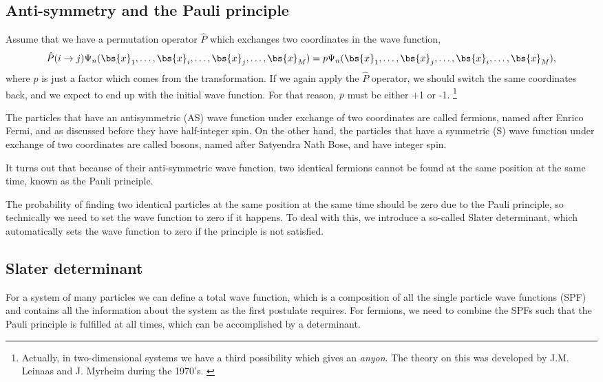 \subsection{Anti-symmetry and the Pauli principle} \label{subsubsec:symmetry}
Assume that we have a permutation operator $\hat{P}$ which exchanges two coordinates in the wave function,
\begin{equation}
\hat{P}(i\rightarrow j)\Psi_n(\bs{x}_1,\hdots,\bs{x}_i,\hdots,\bs{x}_j,\hdots,\bs{x}_M)=p\Psi_n(\bs{x}_1,\hdots,\bs{x}_j,\hdots,\bs{x}_i,\hdots,\bs{x}_M),
\end{equation}
where $p$ is just a factor which comes from the transformation. If we again apply the $\hat{P}$ operator, we should switch the same coordinates back, and we expect to end up with the initial wave function. For that reason, $p$ must be either +1 or -1. \footnote{Actually, in two-dimensional systems we have a third possibility which gives an \textit{anyon}. The theory on this was developed by J.M. Leinaas and J. Myrheim during the 1970's. \cite{leinaas_one_1977}}

The particles that have an antisymmetric (AS) wave function under exchange of two coordinates are called fermions, named after Enrico Fermi, and as discussed before they have half-integer spin. On the other hand, the particles that have a symmetric (S) wave function under exchange of two coordinates are called bosons, named after Satyendra Nath Bose, and have integer spin. 

It turns out that because of their anti-symmetric wave function, two identical fermions cannot be found at the same position at the same time, known as the Pauli principle. 

The probability of finding two identical particles at the same position at the same time should be zero due to the Pauli principle, so technically we need to set the wave function to zero if it happens. To deal with this, we introduce a so-called Slater determinant, which automatically sets the wave function to zero if the principle is not satisfied.

\subsection{Slater determinant} \label{subsec:slater}
For a system of many particles we can define a total wave function, which is a composition of all the single particle wave functions (SPF) and contains all the information about the system as the first postulate requires. For fermions, we need to combine the SPFs such that the Pauli principle is fulfilled at all times, which can be accomplished by a determinant. 

